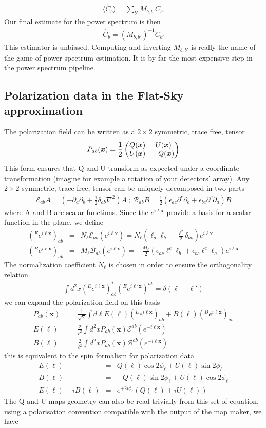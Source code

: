 \documentclass[a4paper, 11pt]{article}
\def\eop{\mathcal{E}}
\def\bop{\mathcal{B}}
\def\ba{\begin{eqnarray}}
\def\ea{\end{eqnarray}}
\begin{document}
\ba
\langle \tilde{C}_{b} \rangle= \sum_{b'} M_{b, b'}  C_{b'}
\ea 
Our final estimate for the power spectrum is then
\ba
\hat{C}_{b}= (M_{b, b'})^{-1} \tilde{C}_{b'} 
\ea
This estimator is unbiased. Computing and inverting $M_{b, b'}$ is really the name of the game of power spectrum estimation. It is by far the most expensive step in the power spectrum pipeline.

\subsection{Polarization data in the Flat-Sky approximation}

The polarization field can be written as  a $2\times2$ symmetric, trace free, tensor 
\ba
P_{ab}(\bm{x})= \frac{1}{2}
\begin{pmatrix} 
Q(\bm{x}) & 
U(\bm{x}) \cr
U(\bm{x}) & 
-Q(\bm{x}) \cr
\end{pmatrix} 
\ea
This form ensures that Q and U transform as expected under a coordinate transformation (imagine for example a rotation of your detectors' array).
Any $2\times2$ symmetric, trace free, tensor can be uniquely decomposed in two parts
\ba 
\eop_{ab} A=(-\partial_{a}\partial_{b}+ \frac{1}{2}\delta_{ab} \nabla^{2})A \ ; \ \bop_{ab}B=\frac{1}{2} (\epsilon_{ac}\partial^{c}\partial_{b} + \epsilon_{bc}\partial^{c}\partial_{a})B
\ea
where A and B are scalar functions. Since the $e^{i\bm{\ell} \bm{x}}$ provide a basis for a scalar function in the plane, we define
\ba
(^{E}e^{i\bm{\ell}\bm{x}})_{ab} &=& N_{\bm{\ell}} \eop_{ab} (e^{i\bm{\ell}\bm{x}})= N_{\bm{\ell}} ( \ell_{a}\ell_{b}- \frac{\bm{\ell}^{2}}{2}\delta_{ab})e^{i\bm{\ell}\bm{x}} \\
(^{B}e^{i\bm{\ell}\bm{x}})_{ab} &=& M_{\bm{\ell}}\bop_{ab} (e^{i\bm{\ell}\bm{x}})=- \frac{M_{\bm{\ell}}}{2} (\epsilon_{ac}\ell^{c}\ell_{b} + \epsilon_{bc}\ell^{c}\ell_{a}) e^{i\bm{\ell}\bm{x}}
\ea
The normalization coefficient $N_{\bm{\ell}}$ is chosen in order to ensure the orthogonality relation.
\ba
\int d^{2}x (^{E}e^{i\bm{\ell}\bm{x}})^{*}_{ab} (^{E}e^{i\bm{\ell}'\bm{x}})^ {ab} = \delta( \bm{\ell}-\bm{\ell}')
\ea
we can expand the polarization field on this basis
\ba
P_{ab}(\bm{x}) &=& \frac{1}{\sqrt{2}} \int d\bm{\ell} E(\bm{\ell}) (^{E}e^{i\bm{\ell}\bm{x}})_{ab} +B({\bm{\ell}}) (^{B}e^{i\bm{\ell}\bm{x}})_{ab} \\
 E({\bm{\ell}}) &=& \frac{2}{\ell^{2}} \int d^{2}x   P_{ab}(\bm{x})   \eop^{ab}(e^{-i\bm{\ell}\bm{x}}) \\
 B({\bm{\ell}}) &=& \frac{2}{\ell^{2}} \int d^{2}x   P_{ab}(\bm{x})  \bop^{ab}(e^{-i\bm{\ell}\bm{x}}) 
\ea
this is equivalent to the spin formalism for polarization data
\ba
E({\bm{\ell}}) &=& Q(\bm{\ell}) \cos 2\phi_{\bm{\ell}}+U(\bm{\ell})\sin 2\phi_{\bm{\ell}}   \\
B({\bm{\ell}}) &=& -Q(\bm{\ell})\sin 2\phi_{\bm{\ell}} +U(\bm{\ell}) \cos 2\phi_{\bm{\ell}}  \\
E({\bm{\ell}}) \pm i B({\bm{\ell}})&=& e^{\mp 2i\phi_{\bm{\ell}}}(Q(\bm{\ell}) \pm i U(\bm{\ell}))
\ea
The Q and U maps geometry can also be read trivially from this set of equation, using a polarisation convention compatible with the output of the map maker, we have
\end{document}
